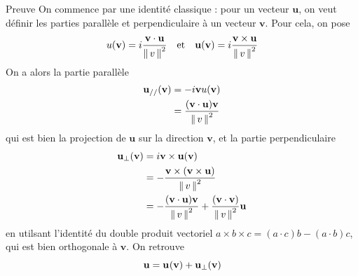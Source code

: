         \begin{demo}{Preuve}
            On commence par une identité classique : pour un vecteur $\mathbf{u}$, on veut définir les parties parallèle et perpendiculaire à un vecteur $\mathbf{v}$. Pour cela, on pose
            \[ u(\mathbf{v}) = i \frac{\mathbf{v} \cdot \mathbf{u}}{\left\lVert \, v \, \right\rVert^2} \quad \text{et} \quad \mathbf{u}(\mathbf{v}) = i \frac{\mathbf{v} \times \mathbf{u}}{\left\lVert \, v \, \right\rVert^2} \]    
            On a alors la partie parallèle 
            \begin{align*}
                \mathbf{u}_{//}(\mathbf{v}) 
                &= - i \mathbf{v} u(\mathbf{v}) \\
                &= \frac{(\mathbf{v} \cdot \mathbf{u}) \mathbf{v}}{\left\lVert \, v \, \right\rVert^2}
            \end{align*}
            qui est bien la projection de $\mathbf{u}$ sur la direction $\mathbf{v}$, et la partie perpendiculaire 
            \begin{align*}
                \mathbf{u}_{\perp}(\mathbf{v})
                &= i \mathbf{v} \times \mathbf{u}(\mathbf{v}) \\
                &= - \frac{\mathbf{v} \times (\mathbf{v} \times \mathbf{u})}{\left\lVert \, v \, \right\rVert^2} \\
                &= - \frac{(\mathbf{v} \cdot \mathbf{u}) \mathbf{v}}{\left\lVert \, v \, \right\rVert^2} +  \frac{(\mathbf{v} \cdot \mathbf{v})}{\left\lVert \, v \, \right\rVert^2} \mathbf{u}
            \end{align*}
            en utilsant l’identité du double produit vectoriel $a \times b \times c = (a \cdot c) b - (a \cdot b) c$, qui est bien orthogonale à $\mathbf{v}$. On retrouve 
            \[ \mathbf{u} = \mathbf{u}_{\\}(\mathbf{v}) + \mathbf{u}_{\perp}(\mathbf{v}) \]



\end{demo}
